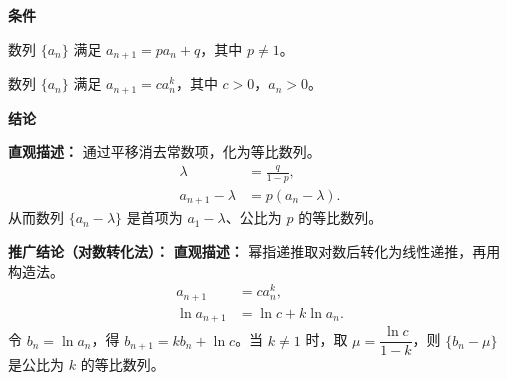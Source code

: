 \begin{statementbox}
	\textbf{\textcolor{CStatement}{条件}}
	\begin{description}[style=nextline,leftmargin=2.8em,labelsep=0.5em,itemsep=0.35em]
		\item[\textbf{\textcolor{CStatement}{条件 1（线性递推）：}}]
			数列 $\{a_n\}$ 满足 $a_{n+1}=p a_n+q$，其中 $p\neq 1$。
		\item[\textbf{\textcolor{CStatement}{条件 2（幂指递推）：}}]
			数列 $\{a_n\}$ 满足 $a_{n+1}=c a_n^k$，其中 $c>0$，$a_n>0$。
	\end{description}
	\textbf{\textcolor{CStatement}{结论}}
	\begin{description}[style=nextline,leftmargin=2.8em,labelsep=0.5em,itemsep=0.45em]
		\item[\textbf{\textcolor{CStatement}{结论一（线性构造法）：}}]
			\textbf{\textcolor{CStatement}{直观描述：}}
			通过平移消去常数项，化为等比数列。
			\[
				\begin{aligned}
					\lambda &= \frac{q}{1-p}, \\ a_{n+1}-\lambda &= p(a_n-\lambda).
			\end{aligned}
			\]
			从而数列 $\{a_n-\lambda\}$ 是首项为 $a_1-\lambda$、公比为 $p$ 的等比数列。
	\end{description}

	\medskip
	\textbf{\textcolor{CStatement}{推广结论（对数转化法）：}}
	\textbf{\textcolor{CStatement}{直观描述：}}
	幂指递推取对数后转化为线性递推，再用构造法。
	\[
		\begin{aligned}
			a_{n+1} &= c a_n^k, \\ \ln a_{n+1} &= \ln c + k\ln a_n.
		\end{aligned}
	\]
	令 $b_n=\ln a_n$，得 $b_{n+1}=k b_n+\ln c$。当 $k\neq 1$ 时，取 $\mu=\dfrac{\ln c}{1-k}$，则 $\{b_n-\mu\}$ 是公比为 $k$ 的等比数列。
\end{statementbox}
